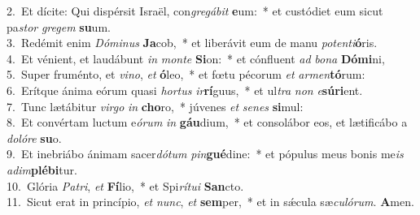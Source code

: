 {2.~}Et dícite: Qui dispérsit Israël, con\textit{gre}\textit{gá}\textit{bit} \textbf{e}um:~* et custódiet eum sicut pa\textit{stor} \textit{gre}\textit{gem} \textbf{su}um.\\
{3.~}Redémit enim \textit{Dó}\textit{mi}\textit{nus} \textbf{Ja}cob,~* et liberávit eum de manu \textit{po}\textit{ten}\textit{ti}\textbf{ó}ris.\\
{4.~}Et vénient, et laudábunt \textit{in} \textit{mon}\textit{te} \textbf{Si}on:~* et cónfluent \textit{ad} \textit{bo}\textit{na} \textbf{Dó}\textbf{mi}ni,\\
{5.~}Super fruménto, et \textit{vi}\textit{no}, \textit{et} \textbf{ó}leo,~* et fœtu pécorum \textit{et} \textit{ar}\textit{men}\textbf{tó}rum:\\
{6.~}Erítque ánima eórum quasi \textit{hor}\textit{tus} \textit{ir}\textbf{rí}guus,~* et ul\textit{tra} \textit{non} \textit{e}\textbf{sú}\textbf{ri}ent.\\
{7.~}Tunc lætábitur \textit{vir}\textit{go} \textit{in} \textbf{cho}ro,~* júvenes \textit{et} \textit{se}\textit{nes} \textbf{si}mul:\\
{8.~}Et convértam luctum e\textit{ó}\textit{rum} \textit{in} \textbf{gáu}dium,~* et consolábor eos, et lætificábo a \textit{do}\textit{ló}\textit{re} \textbf{su}o.\\
{9.~}Et inebriábo ánimam sacer\textit{dó}\textit{tum} \textit{pin}\textbf{gué}dine:~* et pópulus meus bonis me\textit{is} \textit{a}\textit{dim}\textbf{plé}\textbf{bi}tur.\\
{10.~}Glória \textit{Pa}\textit{tri}, \textit{et} \textbf{Fí}lio,~* et Spi\textit{rí}\textit{tu}\textit{i} \textbf{San}cto.\\
{11.~}Sicut erat in princípio, \textit{et} \textit{nunc}, \textit{et} \textbf{sem}per,~* et in sǽcula sæ\textit{cu}\textit{ló}\textit{rum}. \textbf{A}men.\\
